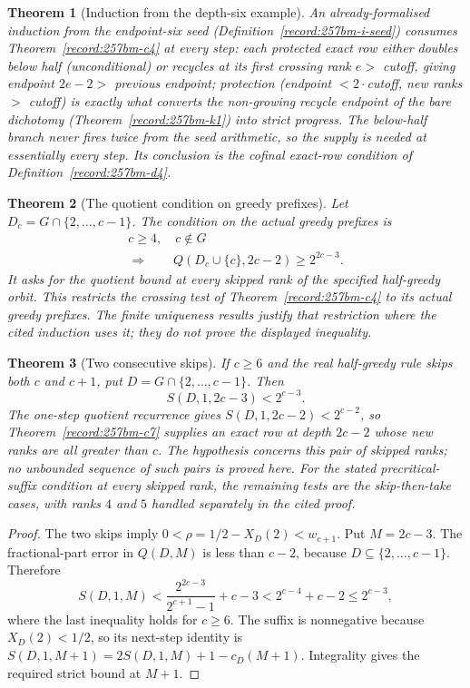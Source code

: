 \documentclass[11pt]{article}
\theoremstyle{plain}
\newtheorem{thm}{Theorem}[section]
\theoremstyle{definition}
\theoremstyle{remark}
\begin{document}
\begin{thm}[Induction from the depth-six example]\label{record:257bm-c5}
An already-formalised induction from the endpoint-six seed (Definition~\ref{record:257bm-i-seed}) consumes Theorem~\ref{record:257bm-c4} at
every step: each protected exact row either doubles below half
(unconditional) or recycles at its first crossing rank $e > $ cutoff, giving endpoint
$2e-2 > $ previous endpoint; protection (endpoint $< 2\cdot$cutoff, new ranks $>$
cutoff) is exactly what converts the non-growing recycle endpoint of the bare dichotomy
(Theorem~\ref{record:257bm-k1}) into strict progress. The below-half branch never fires twice from the seed
arithmetic, so the supply is needed at essentially every step. Its conclusion is
the cofinal exact-row condition of Definition~\ref{record:257bm-d4}.
\end{thm}

\begin{thm}[The quotient condition on greedy prefixes]\label{record:257bm-c6}
Let $D_c=G\cap\{2,\ldots,c-1\}$.  The condition on the actual greedy
prefixes is
\[
 \begin{gathered}
 c\ge4,\quad c\notin G\\
 \Longrightarrow\qquad Q(D_c\cup\{c\},2c-2)\ge2^{2c-3}.
 \end{gathered}
\]
It asks for the quotient bound at every skipped rank of the specified
half-greedy orbit.  This restricts the crossing test of
Theorem~\ref{record:257bm-c4} to its actual greedy prefixes.  The finite
uniqueness results justify that restriction where the cited induction
uses it; they do not prove the displayed inequality.
\end{thm}

\begin{thm}[Two consecutive skips]\label{record:257bm-c6a}
If $c\ge6$ and the real half-greedy rule skips both $c$ and $c+1$,
put $D=G\cap\{2,\ldots,c-1\}$.  Then
\[
 S(D,1,2c-3)<2^{c-3}.
\]
The one-step quotient recurrence gives
$S(D,1,2c-2)<2^{c-2}$, so
Theorem~\ref{record:257bm-c7} supplies an exact row at depth $2c-2$
whose new ranks are all greater than $c$.
The hypothesis concerns this pair of skipped ranks; no unbounded
sequence of such pairs is proved here.  For the stated precritical-suffix
condition at every skipped rank, the remaining tests are the
skip-then-take cases, with ranks $4$ and $5$ handled separately in
the cited proof.
\end{thm}
\begin{proof}
The two skips imply $0<\rho=1/2-X_D(2)<w_{c+1}$.
Put $M=2c-3$.  The fractional-part error in $Q(D,M)$ is less
than $c-2$, because $D\subseteq\{2,\ldots,c-1\}$.  Therefore
\[
 S(D,1,M)
 <\frac{2^{2c-3}}{2^{c+1}-1}+c-3
 <2^{c-4}+c-2\le2^{c-3},
\]
where the last inequality holds for $c\ge6$.
The suffix is nonnegative because $X_D(2)<1/2$, so its next-step
identity is $S(D,1,M+1)=2S(D,1,M)+1-c_D(M+1)$.
Integrality gives the required strict bound at $M+1$.
\end{proof}
\end{document}
